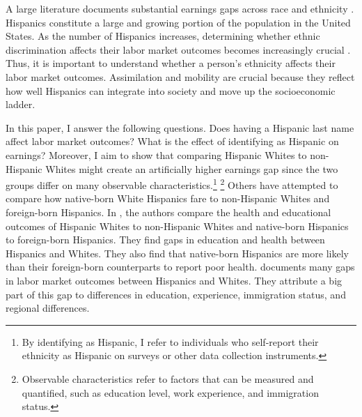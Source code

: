 \documentclass[a4paper,fleqn]{cas-sc}
\begin{document}
A large literature documents substantial earnings gaps across race and ethnicity \citep{bayer2018divergent, charles2008prejudice, card1992school, fryer2004causes, rubinstein2014pride, bertrand2004emily, juhn1991accounting}. Hispanics constitute a large and growing portion of the population in the United States. As the number of Hispanics increases, determining whether ethnic discrimination affects their labor market outcomes becomes increasingly crucial \citep{chettyUnitedStatesStill2014, chettyEffectsExposureBetter2016,chettyFadingAmericanDream2017,abramitzkyImmigrantsAssimilateMore2020a, abramitzkyNationImmigrantsAssimilation2014,abramitzkyCulturalAssimilationAge2016,chettyWhereLandOpportunity2014}. Thus, it is important to understand whether a person's ethnicity affects their labor market outcomes. Assimilation and mobility are crucial because they reflect how well Hispanics can integrate into society and move up the socioeconomic ladder.

In this paper, I answer the following questions. Does having a Hispanic last name affect labor market outcomes? What is the effect of identifying as Hispanic on earnings? Moreover, I aim to show that comparing Hispanic Whites to non-Hispanic Whites might create an artificially higher earnings gap since the two groups differ on many observable characteristics.\footnote{By identifying as Hispanic, I refer to individuals who self-report their ethnicity as Hispanic on surveys or other data collection instruments.} \footnote{Observable characteristics refer to factors that can be measured and quantified, such as education level, work experience, and immigration status.} Others have attempted to compare how native-born White Hispanics fare to non-Hispanic Whites and foreign-born Hispanics. In \citet{antman2020ethnic,antmanEthnicAttritionObserved2016,antmanEthnicAttritionObserved2016a,antmanEthnicAttritionAssimilation2020}, the authors compare the health and educational outcomes of Hispanic Whites to non-Hispanic Whites and native-born Hispanics to foreign-born Hispanics. They find gaps in education and health between Hispanics and Whites. They also find that native-born Hispanics are more likely than their foreign-born counterparts to report poor health. \citet{davilaChangesRelativeEarnings2008} documents many gaps in labor market outcomes between Hispanics and Whites. They attribute a big part of this gap to differences in education, experience, immigration status, and regional differences.
\end{document}
